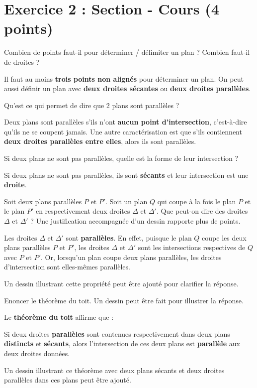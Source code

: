 \documentclass[answers]{exam}
\begin{document}
\section*{Exercice 2 : Section - Cours (4 points)}

\begin{questions} 
\question[0.5] Combien de points faut-il pour déterminer / délimiter un plan ? Combien faut-il de droites ?
\begin{solution}
  Il faut au moins \textbf{trois points non alignés} pour déterminer un plan.  
  On peut aussi définir un plan avec \textbf{deux droites sécantes} ou \textbf{deux droites parallèles}.
  \end{solution}
\question[0.5] Qu'est ce qui permet de dire que 2 plans sont parallèles ?
\begin{solution}
  Deux plans sont parallèles s'ils n'ont \textbf{aucun point d'intersection}, c'est-à-dire qu'ils ne se coupent jamais.  
  Une autre caractérisation est que s'ils contiennent \textbf{deux droites parallèles entre elles}, alors ils sont parallèles.
  \end{solution}
\question[0.5] Si deux plans ne sont pas parallèles, quelle est la forme de leur intersection ? 
\begin{solution}
  Si deux plans ne sont pas parallèles, ils sont \textbf{sécants} et leur intersection est une \textbf{droite}.
  \end{solution}
\question[1.5] Soit deux plans parallèles $P$ et $P'$. Soit un plan $Q$ qui coupe à la fois le plan $P$ et le plan $P'$ en respectivement deux droites $\Delta$ et $\Delta'$. Que peut-on dire des droites $\Delta$ et $\Delta'$ ? Une justification accompagnée d'un dessin rapporte plus de points.
\begin{solution}
  Les droites $\Delta$ et $\Delta'$ sont \textbf{parallèles}.  
  En effet, puisque le plan $Q$ coupe les deux plans parallèles $P$ et $P'$, les droites $\Delta$ et $\Delta'$ sont les intersections respectives de $Q$ avec $P$ et $P'$. Or, lorsqu'un plan coupe deux plans parallèles, les droites d'intersection sont elles-mêmes parallèles.  
  
  Un dessin illustrant cette propriété peut être ajouté pour clarifier la réponse.
  \end{solution}  
\question[1] Enoncer le théorème du toit. Un dessin peut être fait pour illustrer la réponse.
\begin{solution}
  Le \textbf{théorème du toit} affirme que :  
  
  Si deux droites \textbf{parallèles} sont contenues respectivement dans deux plans \textbf{distincts} et \textbf{sécants}, alors l'intersection de ces deux plans est \textbf{parallèle} aux deux droites données.
  
  Un dessin illustrant ce théorème avec deux plans sécants et deux droites parallèles dans ces plans peut être ajouté.
  \end{solution}
\end{questions} 
\end{document}
